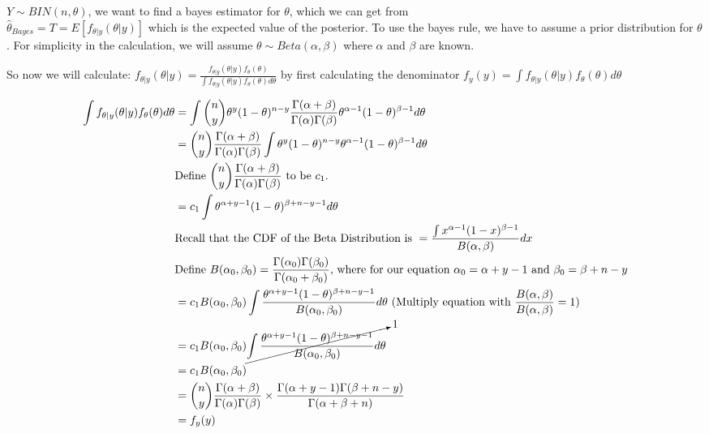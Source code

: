 \documentclass{article}
\begin{document}
$Y \sim BIN(n,\theta)$, we want to find a bayes estimator for $\theta$, which we can get from\\ $\hat{\theta}_{Bayes} = T = E[f_{\theta|y}(\theta|y)]$ which is the expected value of the posterior. To use the bayes rule, we have to assume a prior distribution for $\theta$. For simplicity in the calculation, we will assume $\theta \sim Beta(\alpha,\beta)$ where $\alpha$ and $\beta$ are known.\newline

\noindent So now we will calculate: $f_{\theta|y}(\theta|y) = \frac{f_{\theta|y}(\theta|y)f_{\theta}(\theta)}{\int f_{\theta|y}(\theta|y)f_{\theta}(\theta) d\theta}$ by first calculating the denominator $f_{y}(y) = \int f_{\theta|y}(\theta|y)f_{\theta}(\theta) d\theta$

\begin{align*}
\int f_{\theta|y}(\theta|y)f_{\theta}(\theta) d\theta &= \int \binom{n}{y}\theta^{y}(1-\theta)^{n-y} \frac{\Gamma(\alpha+\beta)}{\Gamma(\alpha)\Gamma(\beta)} \theta^{\alpha-1}(1-\theta)^{\beta-1} d\theta\\
&=\binom{n}{y}\frac{\Gamma(\alpha+\beta)}{\Gamma(\alpha)\Gamma(\beta)} \int \theta^{y}(1-\theta)^{n-y} \theta^{\alpha-1}(1-\theta)^{\beta-1} d\theta\\
&\text{Define } \binom{n}{y}\frac{\Gamma(\alpha+\beta)}{\Gamma(\alpha)\Gamma(\beta)} \text{ to be $c_1$}. \\
&= c_{1} \int \theta^{\alpha + y - 1}(1-\theta)^{\beta + n-y -1}  d\theta\\
&\text{Recall that the CDF of the Beta Distribution is } = \frac{\int x^{\alpha-1} (1-x)^{\beta - 1}}{B(\alpha,\beta)} dx\\
&\text{Define }B(\alpha_0,\beta_0) = \frac{\Gamma(\alpha_0)\Gamma(\beta_0)}{\Gamma(\alpha_0+\beta_0)} 
\text{, where for our equation $\alpha_0 = \alpha + y-1$ and $\beta_0 = \beta+n-y$}\\
&= c_{1}B(\alpha_0,\beta_0) \int \frac{\theta^{\alpha + y - 1}(1-\theta)^{\beta + n-y -1}}{B(\alpha_0,\beta_0)}  d\theta \text{ (Multiply equation with }\frac{B(\alpha,\beta)}{B(\alpha,\beta)} = 1)\\ 
&= c_{1}B(\alpha_0,\beta_0) \cancelto{1}{\int \frac{\theta^{\alpha + y - 1}(1-\theta)^{\beta + n-y -1}}{B(\alpha_0,\beta_0)}  d\theta}\\
&= c_{1}B(\alpha_0,\beta_0)\\
&= \binom{n}{y}\frac{\Gamma(\alpha+\beta)}{\Gamma(\alpha)\Gamma(\beta)} \times \frac{\Gamma(\alpha + y-1)\Gamma(\beta+n-y)}{\Gamma(\alpha+\beta+n)}\\
&= f_{y}(y)
\end{align*}
\end{document}
